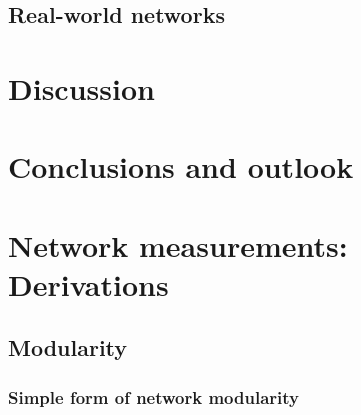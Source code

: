 \documentclass[11 pt , letterpaper , twoside , openright]{book}
\begin{document}
\section{Real-world networks}

\chapter{Discussion}


\chapter{Conclusions and outlook}
\newpage

\pagestyle{fancy}
\fancyhf{}
\lhead{\textcolor{NavyBlue}{\appendixname} \ \textcolor{NavyBlue}{\thechapter}}
\rhead{\rightmark}
\cfoot{\thepage}

\appendix
\addappheadtotoc 

\chapter{Network measurements: Derivations}
\section{Modularity}\label{modul}
\subsection{Simple form of network modularity}\label{simplemod}
\end{document}
